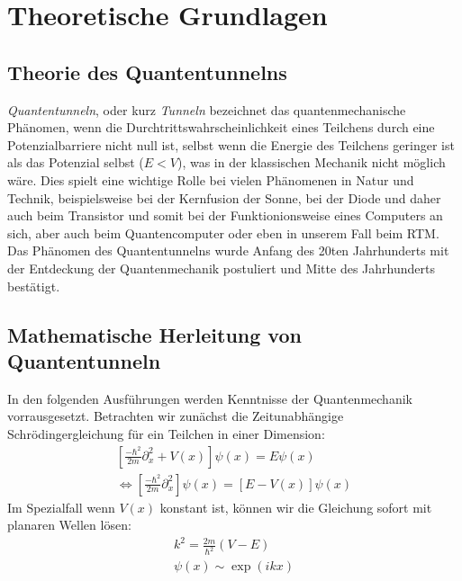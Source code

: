 \section{Theoretische Grundlagen}

\newcommand{\VG}{V_{\mathbf{G}}}
\newcommand{\G}{\mathbf{G}}
\newcommand{\g}{\mathbf{g}}
\newcommand{\R}{\mathbf{r}}
\newcommand{\K}{\mathbf{k}}
\newcommand{\A}{\mathbf{a}}
\newcommand{\ex}{\mathbf{e}^}
\subsection{Theorie des Quantentunnelns}
\textit{Quantentunneln}, oder kurz \textit{Tunneln} 
bezeichnet das quantenmechanische Phänomen, wenn 
die Durchtrittswahrscheinlichkeit eines Teilchens
durch eine Potenzialbarriere nicht null ist, selbst wenn die Energie
des Teilchens geringer ist als das Potenzial selbst ($E < V$), was
in der klassischen Mechanik nicht möglich wäre. Dies
spielt eine wichtige Rolle bei
vielen Phänomenen in Natur und Technik,
beispielsweise bei der Kernfusion der Sonne, bei der Diode und
daher auch beim Transistor und somit bei der Funktionionsweise
eines Computers an sich, aber auch beim Quantencomputer oder
eben in unserem Fall beim RTM. Das Phänomen des Quantentunnelns
wurde Anfang des 20ten Jahrhunderts mit der Entdeckung der 
Quantenmechanik postuliert und Mitte des Jahrhunderts bestätigt.
\subsection{Mathematische Herleitung von Quantentunneln}
In den folgenden Ausführungen werden Kenntnisse der Quantenmechanik
vorrausgesetzt. Betrachten wir zunächst die Zeitunabhängige
Schrödingergleichung für ein Teilchen in einer Dimension:
\begin{align}
\left [ \frac{-\hbar^2}{2m}\partial_x^2 + V(x) \right ]\psi(x) = E\psi(x) \\ 
\Leftrightarrow \left [ \frac{-\hbar^2}{2m}\partial_x^2 \right ]\psi(x) = \left [E-V(x) \right ]\psi(x) 
\end{align}
Im Spezialfall wenn $V(x)$ konstant ist, können wir die Gleichung
sofort mit planaren Wellen lösen:
\begin{align}
    k^2 = \frac{2m}{\hbar^2}(V-E)\\
    \psi(x) \sim \exp(ikx) 
\end{align}
